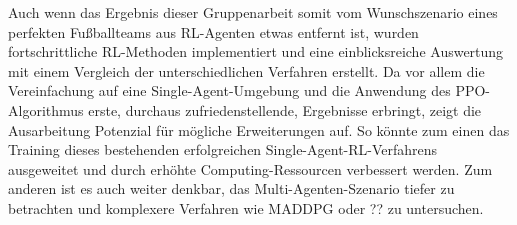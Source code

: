 \documentclass[twocolumn]{webofc}
\begin{document}
Auch wenn das Ergebnis dieser Gruppenarbeit somit vom Wunschszenario eines perfekten Fußballteams aus \ac{RL}-Agenten etwas entfernt ist, wurden fortschrittliche \ac{RL}-Methoden implementiert und eine einblicksreiche Auswertung mit einem Vergleich der unterschiedlichen Verfahren erstellt. Da vor allem die Vereinfachung auf eine Single-Agent-Umgebung und die Anwendung des \ac{PPO}-Algorithmus erste, durchaus zufriedenstellende, Ergebnisse erbringt, zeigt die Ausarbeitung Potenzial für mögliche Erweiterungen auf. So könnte zum einen das Training dieses bestehenden erfolgreichen Single-Agent-RL-Verfahrens ausgeweitet und durch erhöhte Computing-Ressourcen verbessert werden. Zum anderen ist es auch weiter denkbar, das Multi-Agenten-Szenario tiefer zu betrachten und komplexere Verfahren wie MADDPG oder ?? zu untersuchen.


%

\end{document}
